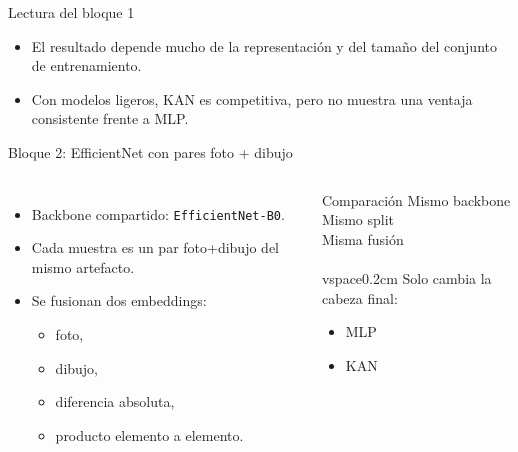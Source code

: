 ﻿\documentclass[aspectratio=169]{beamer}
\begin{document}
\begin{frame}{Lectura del bloque 1}
\Large
\begin{itemize}
  \item El resultado depende mucho de la representaci\'on y del tama\~no del conjunto de entrenamiento.
  \item Con modelos ligeros, KAN es competitiva, pero no muestra una ventaja consistente frente a MLP.
\end{itemize}
\end{frame}

\begin{frame}{Bloque 2: EfficientNet con pares foto + dibujo}
\begin{columns}[T]
\begin{itemize}
  \item Backbone compartido: \texttt{EfficientNet-B0}.
  \item Cada muestra es un par foto+dibujo del mismo artefacto.
  \item Se fusionan dos embeddings:
  \begin{itemize}
    \item foto,
    \item dibujo,
    \item diferencia absoluta,
    \item producto elemento a elemento.
  \end{itemize}
\end{itemize}
\small
\begin{block}{Comparaci\'on}
Mismo backbone\\
Mismo split\\
Misma fusi\'on\\
\\vspace{0.2cm}
Solo cambia la cabeza final:
\begin{itemize}
  \item MLP
  \item KAN
\end{itemize}
\end{block}
\end{columns}
\end{frame}
\end{document}
